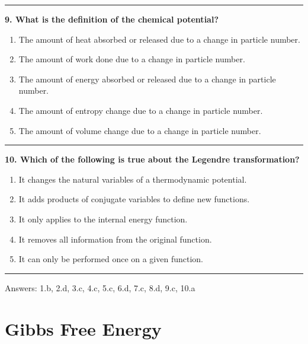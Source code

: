\documentclass[
  9pt,
]{extbook}
\providecommand{\tightlist}{%
  \setlength{\itemsep}{0pt}\setlength{\parskip}{0pt}}
\theoremstyle{definition}
\theoremstyle{definition}
\theoremstyle{definition}
\theoremstyle{remark}
\begin{document}
\begin{center}\rule{0.5\linewidth}{0.5pt}\end{center}

\textbf{9. What is the definition of the chemical potential?}

\begin{enumerate}
\def\labelenumi{\alph{enumi}.}
\tightlist
\item
  The amount of heat absorbed or released due to a change in particle number.
\item
  The amount of work done due to a change in particle number.
\item
  The amount of energy absorbed or released due to a change in particle number.
\item
  The amount of entropy change due to a change in particle number.
\item
  The amount of volume change due to a change in particle number.
\end{enumerate}

\begin{center}\rule{0.5\linewidth}{0.5pt}\end{center}

\textbf{10. Which of the following is true about the Legendre transformation?}

\begin{enumerate}
\def\labelenumi{\alph{enumi}.}
\tightlist
\item
  It changes the natural variables of a thermodynamic potential.
\item
  It adds products of conjugate variables to define new functions.
\item
  It only applies to the internal energy function.
\item
  It removes all information from the original function.
\item
  It can only be performed once on a given function.
\end{enumerate}

\begin{center}\rule{0.5\linewidth}{0.5pt}\end{center}

Answers: 1.b, 2.d, 3.c, 4.c, 5.c, 6.d, 7.c, 8.d, 9.c, 10.a

\renewcommand*{\standardstate}{{-\kern-6pt{\ominus}\kern-6pt-}}

\hypertarget{GibbsFree}{%
\chapter{Gibbs Free Energy}\label{GibbsFree}}
\end{document}
